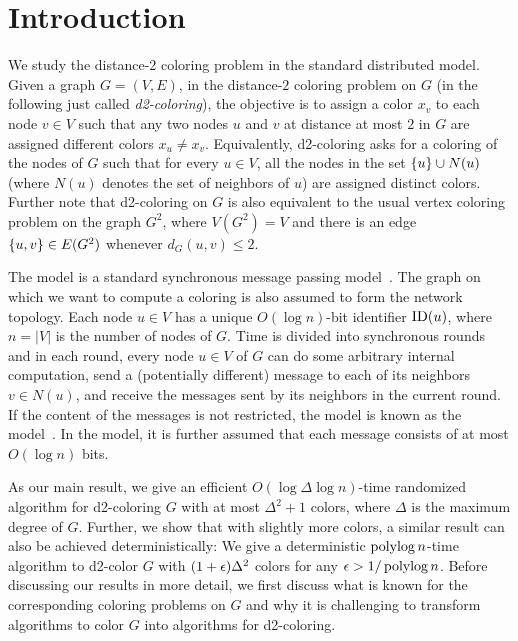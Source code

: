 \section{Introduction} %
\label{sec:intro}
We study the distance-$2$ coloring problem in the standard distributed \CONGEST model. Given a graph $G=(V,E)$, in the distance-$2$ coloring problem on $G$ (in the following just called \emph{d2-coloring}), the objective is to assign a color $x_v$ to each node $v\in V$ such that any two nodes $u$ and $v$ at distance at most $2$ in $G$ are assigned different colors $x_u\neq x_v$. Equivalently, d2-coloring asks for a coloring of the nodes of $G$ such that for every $u\in V$, all the nodes in the set $\left\{u\right\}\cup N(u)$ (where $N(u)$ denotes the set of neighbors of $u$) are assigned distinct colors. Further note that d2-coloring on $G$ is also equivalent to the usual vertex coloring problem on the graph $G^2$, where $V(G^2)=V$ and there is an edge $\left\{u,v\right\}\in E(G^2)$ whenever $d_G(u,v)\leq 2$. 


The \CONGEST model is a standard synchronous message passing model~\cite{peleg00}. The graph on which we want to compute a coloring is also assumed to form the network topology. Each node $u\in V$ has a unique $O(\log n)$-bit identifier $\operatorname{ID}(u)$, where $n=|V|$ is the number of nodes of $G$. Time is divided into synchronous rounds and in each round, every node $u\in V$ of $G$ can do some arbitrary internal computation, send a (potentially different) message to each of its neighbors $v\in N(u)$, and receive the messages sent by its neighbors in the current round. If the content of the messages is not restricted, the model is known as the \LOCAL model~\cite{linial92,peleg00}. In the \CONGEST model, it is further assumed that each message consists of at most $O(\log n)$ bits. 

% 
As our main result, we give an efficient $O(\log\Delta \log n)$-time randomized algorithm for d2-coloring $G$ with at most $\Delta^2+1$ colors, where $\Delta$ is the maximum degree of $G$. Further, we show that with slightly more colors, a similar result can also be achieved deterministically: We give a deterministic $\operatorname{polylog} n$-time algorithm to d2-color $G$ with $(1+\epsilon)\Delta^2$ colors for any $\epsilon>1/\operatorname{polylog} n$. 
Before discussing our results in more detail, we first discuss what is known for the corresponding coloring problems on $G$ and why it is challenging to transform \CONGEST algorithms to color $G$ into \CONGEST algorithms for d2-coloring. 

